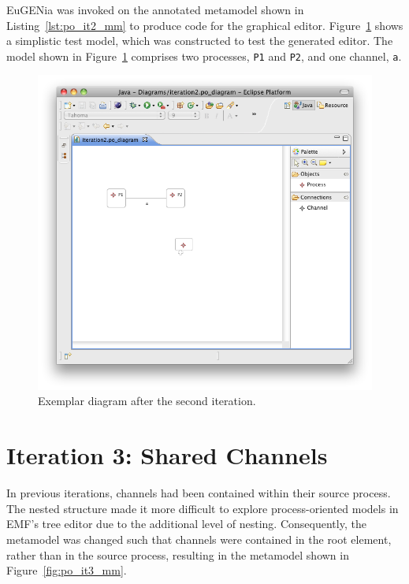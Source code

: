 EuGENia was invoked on the annotated metamodel shown in Listing~\ref{lst:po_it2_mm} to produce code for the graphical editor. Figure~\ref{fig:po_it2_model} shows a simplistic test model, which was constructed to test the generated editor. The model shown in Figure~\ref{fig:po_it2_model} comprises two processes, \texttt{P1} and \texttt{P2}, and one channel, \texttt{a}.

\begin{figure}[htbp]
	\centering
		\includegraphics[scale=0.5]{A.2.ProcessOriented/images/2_model.png}
	\caption{Exemplar diagram after the second iteration.}
	\label{fig:po_it2_model}
\end{figure}

\section{Iteration 3: Shared Channels}
In previous iterations, channels had been contained within their source process. The nested structure made it more difficult to explore process-oriented models in EMF's tree editor due to the additional level of nesting. Consequently, the metamodel was changed such that channels were contained in the root element, rather than in the source process, resulting in the metamodel shown in Figure~\ref{fig:po_it3_mm}.

